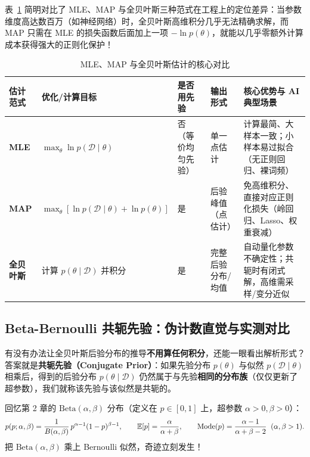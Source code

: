 表~\ref{tab:ch5-mle-map-bayes} 简明对比了 MLE、MAP 与全贝叶斯三种范式在工程上的定位差异：当参数维度高达数百万（如神经网络）时，全贝叶斯高维积分几乎无法精确求解，而 MAP 只需在 MLE 的损失函数后面加上一项 $-\ln p(\theta)$，就能以几乎零额外计算成本获得强大的正则化保护！

\begin{table}[htbp]
\centering
\caption{MLE、MAP 与全贝叶斯估计的核心对比}
\label{tab:ch5-mle-map-bayes}
\footnotesize
\begin{tabularx}{\linewidth}{@{}p{21mm}p{26mm}p{24mm}p{24mm}X@{}}
\toprule
\textbf{估计范式} & \textbf{优化/计算目标} & \textbf{是否用先验} & \textbf{输出形式} & \textbf{核心优势与 AI 典型场景} \\
\midrule
\textbf{MLE} & $\max_\theta \ln p(\mathcal{D}\mid\theta)$ & 否（等价均匀先验） & 单一点估计 & 计算最简、大样本一致；小样本易过拟合（无正则回归、裸词频） \\
\textbf{MAP} & $\max_\theta [\ln p(\mathcal{D}\mid\theta)+\ln p(\theta)]$ & 是 & 后验峰值（点估计） & 免高维积分、直接对应正则化损失（岭回归、Lasso、权重衰减） \\
\textbf{全贝叶斯} & 计算 $p(\theta\mid\mathcal{D})$ 并积分 & 是 & 完整后验分布/均值 & 自动量化参数不确定性；共轭时有闭式解，高维需采样/变分近似 \\
\bottomrule
\end{tabularx}
\end{table}

\subsection{Beta-Bernoulli 共轭先验：伪计数直觉与实测对比}
\label{subsec:ch5-beta-bern}

有没有办法让全贝叶斯后验分布的推导\textbf{不用算任何积分}，还能一眼看出解析形式？答案就是\textbf{共轭先验（Conjugate Prior）}：如果先验分布 $p(\theta)$ 与似然 $p(\mathcal{D}\mid\theta)$ 相乘后，得到的后验分布 $p(\theta\mid\mathcal{D})$ 仍然属于与先验\textbf{相同的分布族}（仅仅更新了超参数），我们就称该先验与该似然是共轭的。

回忆第 2 章的 $\mathrm{Beta}(\alpha, \beta)$ 分布（定义在 $p \in [0,1]$ 上，超参数 $\alpha > 0, \beta > 0$）：
\[
  p(p; \alpha, \beta) = \frac{1}{B(\alpha, \beta)}\, p^{\alpha - 1}(1 - p)^{\beta - 1},
  \qquad
  \mathbb{E}[p] = \frac{\alpha}{\alpha + \beta},
  \qquad
  \mathrm{Mode}(p) = \frac{\alpha - 1}{\alpha + \beta - 2}\;\;(\alpha, \beta > 1).
\]
把 $\mathrm{Beta}(\alpha, \beta)$ 乘上 Bernoulli 似然，奇迹立刻发生！

